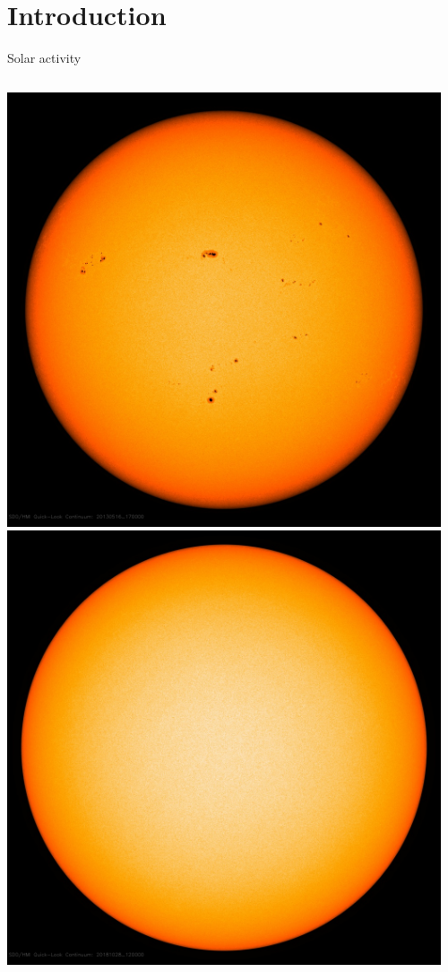 \section{Introduction}

\begin{frame}[plain,c]{Solar activity}{}
	\begin{columns}[c]
		
		\includegraphics[width=0.96\textwidth]{../talk_figures/20130516_170000_1024_HMIIC.jpg}
		\pause
		\includegraphics[width=0.96\textwidth]{../talk_figures/20181028_120000_1024_HMIIC.jpg}
		

\end{columns}
\end{frame}
